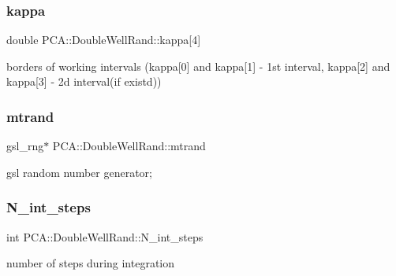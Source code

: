 \subsubsection{\texorpdfstring{kappa}{kappa}}
{\footnotesize\ttfamily double P\+C\+A\+::\+Double\+Well\+Rand\+::kappa\mbox{[}4\mbox{]}\hspace{0.3cm}{\ttfamily [private]}}



borders of working intervals (kappa\mbox{[}0\mbox{]} and kappa\mbox{[}1\mbox{]} -\/ 1st interval, kappa\mbox{[}2\mbox{]} and kappa\mbox{[}3\mbox{]} -\/ 2d interval(if existd)) 

\hypertarget{class_p_c_a_1_1_double_well_rand_a59745c0fe851353175d8435906b7e612}{}\label{class_p_c_a_1_1_double_well_rand_a59745c0fe851353175d8435906b7e612} 
\subsubsection{\texorpdfstring{mtrand}{mtrand}}
{\footnotesize\ttfamily gsl\+\_\+rng$\ast$ P\+C\+A\+::\+Double\+Well\+Rand\+::mtrand\hspace{0.3cm}{\ttfamily [private]}}



gsl random number generator; 

\hypertarget{class_p_c_a_1_1_double_well_rand_a935058a518ed28d62b9e2285c30382dc}{}\label{class_p_c_a_1_1_double_well_rand_a935058a518ed28d62b9e2285c30382dc} 
\subsubsection{\texorpdfstring{N\+\_\+int\+\_\+steps}{N\_int\_steps}}
{\footnotesize\ttfamily int P\+C\+A\+::\+Double\+Well\+Rand\+::\+N\+\_\+int\+\_\+steps\hspace{0.3cm}{\ttfamily [private]}}



number of steps during integration 

\hypertarget{class_p_c_a_1_1_double_well_rand_a89c48e652127b71600906d93f628dad5}{}\label{class_p_c_a_1_1_double_well_rand_a89c48e652127b71600906d93f628dad5} 
